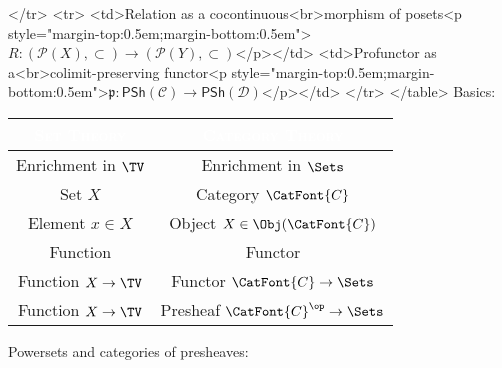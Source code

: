   </tr>
  <tr>
    <td>Relation as a cocontinuous<br>morphism of posets<p style="margin-top:0.5em;margin-bottom:0.5em">$R\colon(\mathcal{P}(X),\subset)\to(\mathcal{P}(Y),\subset)$</p></td>
    <td>Profunctor as a<br>colimit-preserving functor<p style="margin-top:0.5em;margin-bottom:0.5em">$\mathfrak{p}\colon\mathsf{PSh}(\mathcal{C})\to\mathsf{PSh}(\mathcal{D})$</p></td>
  </tr>
</table>
\newline
Basics:
\begingroup%
\renewcommand{\arraystretch}{1.2}
\begin{center}
    \begin{tabular}{|c|c|}\hline\rowcolor{darkRed}
        \textcolor{white}{\textbf{\textsc{Set Theory}}} & \textcolor{white}{\textsc{Category Theory}} \\\hline\rowcolor{backgroundColor}
        Enrichment in $\TV$                    & Enrichment in $\Sets$                       \\\rowcolor{black!05!backgroundColor}
        Set $X$                                & Category $\CatFont{C}$                      \\\rowcolor{backgroundColor}
        Element $x\in X$                       & Object $X\in\Obj(\CatFont{C})$              \\\rowcolor{black!05!backgroundColor}
        Function                               & Functor                                     \\\rowcolor{backgroundColor}
        Function $X\to\TV$                     & Functor  $\CatFont{C}\to\Sets$              \\\rowcolor{black!05!backgroundColor}
        Function $X\to\TV$                     & Presheaf $\CatFont{C}^{\op}\to\Sets$        \\\hline
    \end{tabular}
\end{center}
\endgroup
Powersets and categories of presheaves:
\begingroup%
\setlength\cellspacetoplimit{3pt}
\setlength\cellspacebottomlimit{3pt}
\renewcommand{\arraystretch}{1.2}
